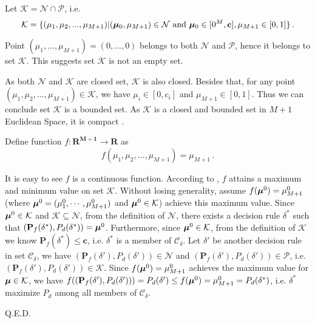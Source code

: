 Let $\mathcal{K} = \mathcal{N} \cap \mathcal{P}$, i.e.
\begin{equation}
\label{apr14a0}
\mathcal{K} = \{
(\mu_1, \mu_2, ..., \mu_{M+1}) | (\boldsymbol{\mu}_0, \mu_{M+1}) \in \mathcal{N} \text{ and } \boldsymbol{\mu}_0 \in [0^M, \mathbf{c}], \mu_{M+1} \in [0, 1]
\}\,.
\end{equation}

Point $(\mu_1, ..., \mu_{M+1}) = (0, ..., 0)$ belongs to both $\mathcal{N}$ and $\mathcal{P}$, hence it belongs to set $\mathcal{K}$. This suggests set $\mathcal{K}$ is not an empty set.

As both $\mathcal{N}$ and $\mathcal{K}$ are closed set, $\mathcal{K}$ is also closed. Besides that, for any point  $(\mu_1, \mu_2, ..., \mu_{M+1}) \in \mathcal{K}$, we have $\mu_i \in [0, c_i]$ and $\mu_{M+1} \in [0,1]$. Thus we can conclude set $\mathcal{K}$ is a bounded set. As $\mathcal{K}$ is a closed and bounded set in $M+1$ Euclidean Space, it is compact \cite{johnsonbaugh2012foundations}. 

Define function $f: \mathbf{R^{M+1}} \rightarrow \mathbf{R}$ as
\begin{equation}
f(\mu_1, \mu_2, ..., \mu_{M+1}) = \mu_{M+1}\,.
\end{equation}

It is easy to see $f$ is a continuous function. According to \cite{johnsonbaugh2012foundations}, $f$ attains a maximum and minimum value on set $\mathcal{K}$. 
Without losing generality, assume $f(\boldsymbol{\mu}^0)  = \mu_{M+1}^0$ (where $\boldsymbol{\mu}^0 = (\mu_1^0, \cdots, \mu_{M+1}^0)$ and $\boldsymbol{\mu}^0 \in \mathcal{K}$) achieve this maximum value. 
Since $\boldsymbol{\mu}^0 \in \mathcal{K}$ and $\mathcal{K}  \subseteq  \mathcal{N}$, from the definition of $\mathcal{N}$, there exists a decision rule $\delta^\ast$ such that $(\mathbf{P}_{f}(\delta^\ast), P_d(\delta^\ast)) = \boldsymbol{\mu}^0$.  
Furthermore, since $\boldsymbol{\mu}^0 \in \mathcal{K} $, from the definition of $\mathcal{K}$ we know $\mathbf{P}_{f}(\delta^\ast) \leq \mathbf{c}$, 
i.e. $\delta^\ast$ is a member of $\mathcal{C}_\delta$. 
Let $\delta' $ be another decision rule in set $\mathcal{C}_\delta$, we have $(\mathbf{P}_f(\delta'), P_d(\delta')) \in \mathcal{N}$ and $(\mathbf{P}_f(\delta'), P_d(\delta')) \in \mathcal{P}$, i.e. $(\mathbf{P}_f(\delta'), P_d(\delta')) \in \mathcal{K}$.
Since $f(\boldsymbol{\mu}^0) = \mu_{M+1}^0$ achieves the maximum value for $\boldsymbol{\mu} \in \mathcal{K}$, we have
$f((\mathbf{P}_f(\delta'), P_d(\delta')))  = P_d(\delta') \leq  f(\boldsymbol{\mu}^0) = \mu_{M+1}^0 =  P_d(\delta^\ast)$, i.e. $\delta^\ast$ maximize $P_d$ among all members of $\mathcal{C}_\delta$.

Q.E.D.
